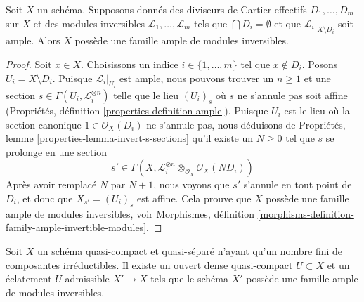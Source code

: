 \begin{lemma}
\label{lemma-get-ample-family}
Soit $X$ un schéma. Supposons donnés des diviseurs de Cartier effectifs
$D_1, \ldots, D_m$ sur $X$ et des modules inversibles
$\mathcal{L}_1, \ldots, \mathcal{L}_m$ tels que
$\bigcap D_i = \emptyset$ et que $\mathcal{L}_i|_{X \setminus D_i}$
soit ample. Alors $X$ possède une famille ample de modules inversibles.
\end{lemma}

\begin{proof}
Soit $x \in X$. Choisissons un indice $i \in \{1, \ldots, m\}$
tel que $x \not \in D_i$. Posons $U_i = X \setminus D_i$.
Puisque $\mathcal{L}_i|_{U_i}$ est ample, nous pouvons trouver un $n \geq 1$ et
une section $s \in \Gamma(U_i, \mathcal{L}_i^{\otimes n})$
telle que le lieu $(U_i)_s$ où $s$ ne s'annule pas soit affine
(Propriétés, définition \ref{properties-definition-ample}).
Puisque $U_i$ est le lieu où la section canonique
$1 \in \mathcal{O}_X(D_i)$ ne s'annule pas, nous déduisons de
Propriétés, lemme \ref{properties-lemma-invert-s-sections}
qu'il existe un $N \geq 0$ tel que $s$ se prolonge en une section
$$
s' \in \Gamma(X, \mathcal{L}_i^{\otimes n} \otimes_{\mathcal{O}_X}
\mathcal{O}_X(N D_i))
$$
Après avoir remplacé $N$ par $N + 1$, nous voyons que $s'$ s'annule en tout
point de $D_i$, et donc que $X_{s'} = (U_i)_s$ est affine.
Cela prouve que $X$ possède une famille ample de modules inversibles, voir
Morphismes, définition
\ref{morphisms-definition-family-ample-invertible-modules}.
\end{proof}

\begin{lemma}
\label{lemma-blow-up-ample-family}
\begin{reference}
\cite[Proposition 1.3.1]{Gross-thesis}
\end{reference}
Soit $X$ un schéma quasi-compact et quasi-séparé n'ayant qu'un nombre fini de
composantes irréductibles. Il existe un ouvert dense quasi-compact
$U \subset X$ et un éclatement $U$-admissible $X' \to X$ tels que le
schéma $X'$ possède une famille ample de modules inversibles.
\end{lemma}


